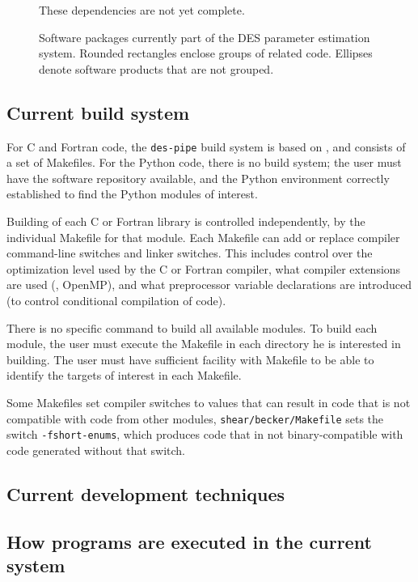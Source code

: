\documentclass[draftmode,draftwater]{memarticle}
\begin{document}
\begin{figure}
{}
\begin{fixme}
  These dependencies are not yet complete.
\end{fixme}
  \caption{Software packages currently part of the DES parameter
  estimation system. Rounded rectangles enclose groups of related
  code. Ellipses denote software products that are not grouped.}
  \label{fig:astropackages}
\end{figure}


\subsection{Current build system}

For C and Fortran code, the \texttt{des-pipe} build system is based on
, and consists of a set of Makefiles. For the Python code,
there is no build system; the user must have the software repository
available, and the Python environment correctly established to find the
Python modules of interest.

Building of each C or Fortran library is controlled independently, by the
individual Makefile for that module. Each Makefile can add or replace
compiler command-line switches and linker switches. This includes control over
the optimization level used by the C or Fortran compiler, what compiler
extensions are used (\eg, OpenMP), and what preprocessor variable
declarations are introduced (to control conditional compilation of
code).

There is no specific command to build all available modules. To build
each module, the user must execute the Makefile in each directory he is
interested in building. The user must have sufficient facility with
Makefile to be able to identify the targets of interest in each
Makefile.

Some Makefiles set compiler switches to values that can result in code that
is not compatible with code from other modules, \eg
\texttt{shear/becker/Makefile} sets the switch \texttt{-fshort-enums},
which produces code that in not binary-compatible with code generated
without that switch.
\subsection{Current development techniques}
\subsection{How programs are executed in the current system}
\end{document}
